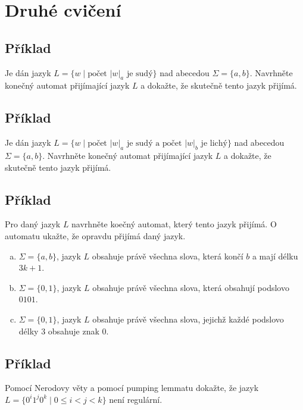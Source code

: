 \section{Druhé cvičení}

\subsection{Příklad}

Je dán jazyk $L = \{w \mid \text{počet } |w|_a \text{ je sudý}\}$ nad abecedou $\Sigma = \{a,b\}$. Navrhněte konečný automat přijímající jazyk $L$ a dokažte, že skutečně tento jazyk přijímá. 

\subsection{Příklad}
Je dán jazyk $L = \{w \mid \text{počet } |w|_a \text{ je sudý a počet } |w|_b \text{ je lichý}\}$ nad abecedou $\Sigma = \{a,b\}$. Navrhněte konečný automat přijímající jazyk $L$ a dokažte, že skutečně tento jazyk přijímá. 

\subsection{Příklad}
Pro daný jazyk $L$ navrhněte koečný automat, který tento jazyk přijímá. O automatu ukažte, že opravdu přijímá daný jazyk.

\begin{enumerate}[a), noitemsep]
    \item $\Sigma = \{a,b\}$, jazyk $L$ obsahuje právě všechna slova, která končí $b$ a mají délku $3k+1$.
    \item $\Sigma = \{0,1\}$, jazyk $L$ obsahuje právě všechna slova, která obsahují podslovo $0101$.
    \item $\Sigma = \{0,1\}$, jazyk $L$ obsahuje právě všechna slova, jejichž každé podslovo délky $3$ obsahuje znak $0$.
\end{enumerate}

\subsection{Příklad}
Pomocí Nerodovy věty a pomocí pumping lemmatu dokažte, že jazyk $L = \{0^i 1^j 0^k \mid 0 \leq i < j <k\}$ není regulární.